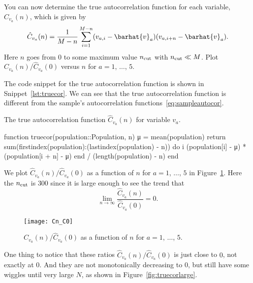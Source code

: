 \Question{} You can now determine the true autocorrelation function for each variable,
\(\hat{C}_{v_a}(n)\), which is given by
%
\begin{equation}
    \hat{C}_{v_a}(n) = \frac{ 1 }{ M - n }
    \sum_{i=1}^{M-n} (v_{a,i} - \barhat{v}_a) (v_{a,i + n} - \barhat{v}_a).
\end{equation}
%
Here \(n\) goes from \(0\) to some maximum value \(n_\textnormal{cut}\) with
\(n_\textnormal{cut} \ll M\).
Plot \(\hat{C}_{v_a}(n) / \hat{C}_{v_a}(0)\) versus \(n\) for \(a = 1\), \(\ldots\), \(5\).

\Answer{}
The code snippet for the true autocorrelation function is shown in Snippet~\ref{lst:truecor}.
We can see that the true autocorrelation function is different from the sample's
autocorrelation functions~\eqref{eq:sampleautocor}.

\begin{algorithm}
    \caption{The true autocorrelation function \(\hat{C}_{v_a}(n)\) for variable \(v_a\).}
    \label{lst:truecor}
    \begin{juliacode}
        function truecor(population::Population, n)
            μ = mean(population)
            return sum(firstindex(population):(lastindex(population) - n)) do i
                (population[i] - μ) * (population[i + n] - μ)
            end / (length(population) - n)
        end
    \end{juliacode}
\end{algorithm}

We plot \(\hat{C}_{v_a}(n) / \hat{C}_{v_a}(0)\) as a function of \(n\) for \(a = 1\), \(\ldots\),
\(5\) in Figure~\ref{fig:truecor}.
Here the \(n_\textnormal{cut}\) is \(300\) since it is large enough to see the trend
that
%
\begin{equation}
    \lim_{n \rightarrow \infty} \frac{ \hat{C}_{v_a}(n) }{ \hat{C}_{v_a}(0) } = 0.
\end{equation}

\begin{figure}[h]
    \centering
    \texttt{[image: Cn\_C0]}
    \caption{\(\hat{C}_{v_a}(n) / \hat{C}_{v_a}(0)\) as a function of \(n\) for
        \(a = 1\), \(\ldots\), \(5\).}
    \label{fig:truecor}
\end{figure}

One thing to notice that these ratios \(\hat{C}_{v_a}(n) / \hat{C}_{v_a}(0)\)
is just close to \(0\), not exactly at \(0\). And they are not monotonically decreasing
to \(0\), but still have some wiggles until very large \(N\), as shown in
Figure~\ref{fig:truecorlarge}.


